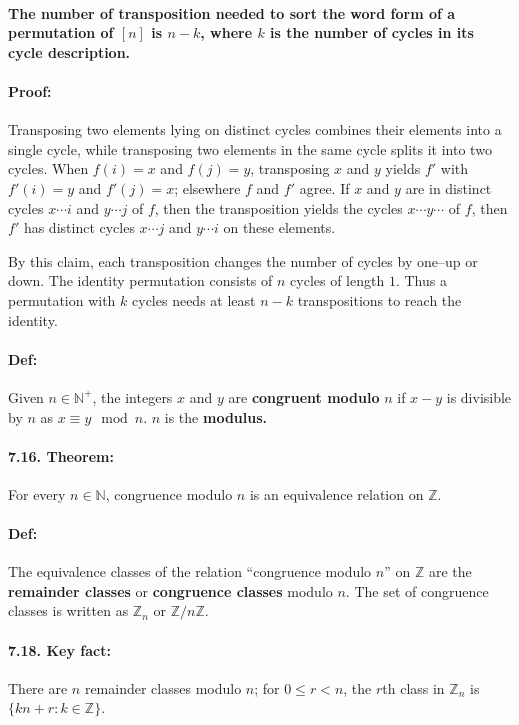 \documentclass[a4paper, 11pt, twoside]{article}
\begin{document}
\paragraph{The number of transposition needed to sort the word form of a permutation of $[n]$ is $n-k$, where $k$ is the number of cycles in its cycle description.}

\paragraph{Proof:} Transposing two elements lying on distinct cycles combines their elements into a single cycle, while transposing two elements in the same cycle splits it into two cycles. When $f(i)=x$ and $f(j)=y$, transposing $x$ and $y$ yields $f'$ with $f'(i)=y$ and $f'(j)=x$; elsewhere $f$ and $f'$ agree. If $x$ and $y$ are in distinct cycles $x\cdots i$ and $y\cdots j$ of $f$, then the transposition yields the cycles $x\cdots y\cdots$ of $f$, then $f'$ has distinct cycles $x\cdots j$ and $y\cdots i$ on these elements.

By this claim, each transposition changes the number of cycles by one--up or down. The identity permutation consists of $n$ cycles of length $1$. Thus a permutation with $k$ cycles needs at least $n-k$ transpositions to reach the identity.

\paragraph{Def:} Given $n\in\mathbb{N^+}$, the integers $x$ and $y$ are \textbf{congruent modulo} $n$ if $x-y$ is divisible by $n$ as $x\equiv y\mod n$. $n$ is the \textbf{modulus.}

\paragraph{7.16. Theorem:} For every $n\in\mathbb{N}$, congruence modulo $n$ is an equivalence relation on $\mathbb{Z}$.

\paragraph{Def:} The equivalence classes of the relation ``congruence modulo $n$'' on $\mathbb{Z}$ are the \textbf{remainder classes} or \textbf{congruence classes} modulo $n$. The set of congruence classes is written as $\mathbb{Z}_n$ or $\mathbb{Z}/n\mathbb{Z}$.

\paragraph{7.18. Key fact:} There are $n$ remainder classes modulo $n$; for $0 \leq r < n$, the $r$th class in $\mathbb{Z}_n$ is $\{kn+r: k\in\mathbb{Z}\}$.
\end{document}
